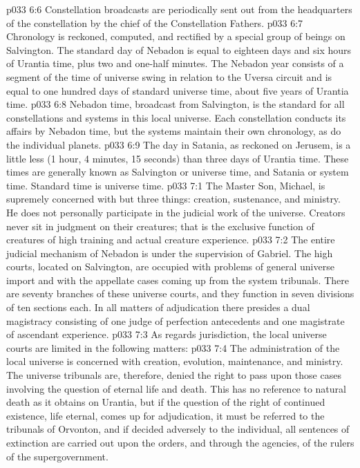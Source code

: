 \vs p033 6:6 Constellation broadcasts are periodically sent out from the headquarters of the constellation by the chief of the Constellation Fathers.
\vs p033 6:7 \pc Chronology is reckoned, computed, and rectified by a special group of beings on Salvington. The standard day of Nebadon is equal to eighteen days and six hours of Urantia time, plus two and one\hyp{}half minutes. The Nebadon year consists of a segment of the time of universe swing in relation to the Uversa circuit and is equal to one hundred days of standard universe time, about five years of Urantia time.
\vs p033 6:8 Nebadon time, broadcast from Salvington, is the standard for all constellations and systems in this local universe. Each constellation conducts its affairs by Nebadon time, but the systems maintain their own chronology, as do the individual planets.
\vs p033 6:9 The day in Satania, as reckoned on Jerusem, is a little less (1 hour, 4 minutes, 15 seconds) than three days of Urantia time. These times are generally known as Salvington or universe time, and Satania or system time. Standard time is universe time.
\vs p033 7:1 The Master Son, Michael, is supremely concerned with but three things: creation, sustenance, and ministry. He does not personally participate in the judicial work of the universe. Creators never sit in judgment on their creatures; that is the exclusive function of creatures of high training and actual creature experience.
\vs p033 7:2 The entire judicial mechanism of Nebadon is under the supervision of Gabriel. The high courts, located on Salvington, are occupied with problems of general universe import and with the appellate cases coming up from the system tribunals. There are seventy branches of these universe courts, and they function in seven divisions of ten sections each. In all matters of adjudication there presides a dual magistracy consisting of one judge of perfection antecedents and one magistrate of ascendant experience.
\vs p033 7:3 As regards jurisdiction, the local universe courts are limited in the following matters:
\vs p033 7:4 \bibnobreakspace The administration of the local universe is concerned with creation, evolution, maintenance, and ministry. The universe tribunals are, therefore, denied the right to pass upon those cases involving the question of eternal life and death. This has no reference to natural death as it obtains on Urantia, but if the question of the right of continued existence, life eternal, comes up for adjudication, it must be referred to the tribunals of Orvonton, and if decided adversely to the individual, all sentences of extinction are carried out upon the orders, and through the agencies, of the rulers of the supergovernment.
